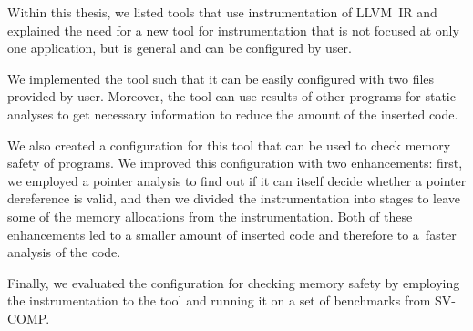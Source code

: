 Within this thesis, we listed tools that use instrumentation of LLVM~IR and
explained the need for a new tool for instrumentation that is not focused at
only one application, but is general and can be configured by user.

We implemented the tool such that it can be easily configured with two files
provided by user. Moreover, the tool can use results of other programs for
static analyses to get necessary information to reduce the amount of the
inserted code.

We also created a configuration for this tool that can be used to check memory
safety of programs. We improved this configuration with two enhancements:
first, we employed a pointer analysis to find out if it can itself decide
whether a pointer dereference is valid, and then we divided the instrumentation
into stages to leave some of the memory allocations from the instrumentation.
Both of these enhancements led to a smaller amount of inserted code and
therefore to a~faster analysis of the code.

Finally, we evaluated the configuration for checking memory safety by employing
the instrumentation to the tool \symbiotic and running it on a set of
benchmarks from SV-COMP.
